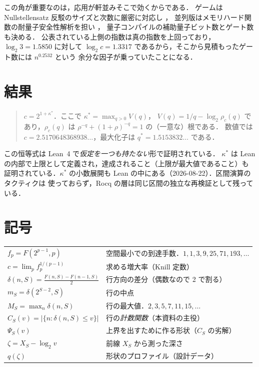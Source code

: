 \documentclass[a4paper,11pt]{jsarticle}
\begin{document}
この角が重要なのは，応用が軒並みそこで効くからである．
ゲームは Nullstellensatz 反駁のサイズと次数に厳密に対応し \cite{RMNR21}，
並列版はメモリハード関数の耐量子安全性解析を担い \cite{BHL22}，
量子コンパイルの補助量子ビット数とゲート数も決める．
公表されている上側の指数は真の指数を上回っており，$\log_2 3 = 1.5850$ に対して
$\log_2 c = 1.3317$ であるから，そこから見積もったゲート数には $n^{0.2532}$ という
余分な因子が乗っていたことになる．

\section{結果}
\begin{quote}
$c = 2^{1+\kappa^*}$．ここで $\kappa^* = \max_{q>0} V(q)$，
$V(q) = 1/q - \log_2 \rho_c(q)$ であり，$\rho_c(q)$ は
$\rho^{-q} + (1{+}\rho)^{-q} = 1$ の（一意な）根である．
数値では $c = 2.5170648368938\ldots$，最大化子は $q^* = 1.5153832\ldots$ である．
\end{quote}
この恒等式は Lean~4 で\emph{仮定を一つも持たない}形で証明されている．
$\kappa^*$ は Lean の内部で上限として定義され，達成されること（上限が最大値であること）も
証明されている．$\kappa^*$ の小数展開も Lean の中にある（2026-08-22）．区間演算のタクティクは
使っておらず，Rocq の層は同じ区間の独立な再検証として残っている．

\section{記号}
\begin{center}
\begin{tabular}{ll}
\hline
$f_p = F(2^{p-1},p)$ & 空間最小での到達手数．$1,1,3,9,25,71,193,\dots$ \\
$c = \lim_p f_p^{1/(p-1)}$ & 求める増大率（Knill 定数） \\
$\delta(n,S) = \frac{F(n,S)-F(n-1,S)}{2}$ & 行方向の差分（偶数なので 2 で割る） \\
$m_S = \delta(2^{S-2},S)$ & 行の中点 \\
$M_S = \max_n \delta(n,S)$ & 行の最大値．$2,3,5,7,11,15,\dots$ \\
$C_S(v) = |\{n : \delta(n,S) \le v\}|$ & 行の\emph{計数関数}（本資料の主役） \\
$\Psi_S(v)$ & 上界を出すために作る形状（$C_S$ の劣解） \\
$\zeta = X_S - \log_2 v$ & 前線 $X_S$ から測った深さ \\
$q(\zeta)$ & 形状のプロファイル（設計データ） \\
\hline
\end{tabular}
\end{center}
\end{document}
